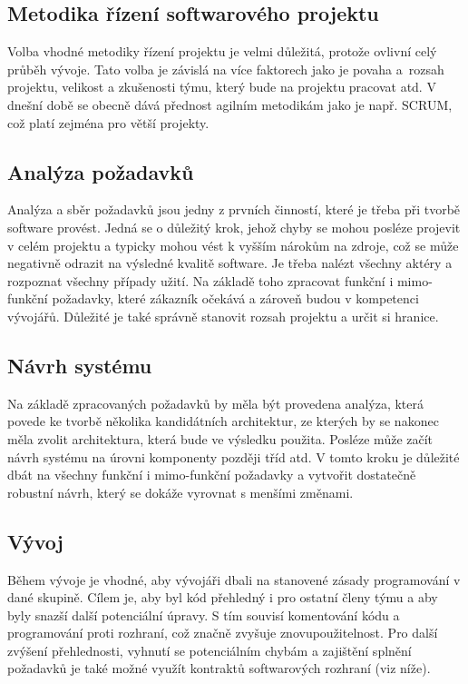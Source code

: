 	\subsection{Metodika řízení softwarového projektu}
		Volba vhodné metodiky řízení projektu je velmi důležitá, protože ovlivní celý průběh vývoje. Tato volba je závislá na více faktorech jako je povaha a~rozsah projektu, velikost a zkušenosti týmu, který bude na projektu pracovat atd. V dnešní době se obecně dává přednost agilním metodikám jako je např. SCRUM, což platí zejména pro větší projekty.
	
	\subsection{Analýza požadavků}
		Analýza a sběr požadavků jsou jedny z prvních činností, které je třeba při tvorbě software provést. Jedná se o důležitý krok, jehož chyby se mohou posléze projevit v celém projektu a typicky mohou vést k vyšším nárokům na zdroje, což se může negativně odrazit na výsledné kvalitě software. Je třeba nalézt všechny aktéry a rozpoznat všechny případy užití. Na základě toho zpracovat funkční i mimo-funkční požadavky, které zákazník očekává a zároveň budou v kompetenci vývojářů. Důležité je také správně stanovit rozsah projektu a určit si hranice. 

	\subsection{Návrh systému}
		Na základě zpracovaných požadavků by měla být provedena analýza, která povede ke tvorbě několika kandidátních architektur, ze kterých by se nakonec měla zvolit architektura, která bude ve výsledku použita. Posléze může začít návrh systému na úrovni komponenty později tříd atd. V tomto kroku je důležité dbát na všechny funkční i mimo-funkční požadavky a vytvořit dostatečně robustní návrh, který se dokáže vyrovnat s menšími změnami.
		
	\subsection{Vývoj}
		Během vývoje je vhodné, aby vývojáři dbali na stanovené zásady programování v dané skupině. Cílem je, aby byl kód přehledný i pro ostatní členy týmu a aby byly snazší další potenciální úpravy. S tím souvisí komentování kódu a programování proti rozhraní, což značně zvyšuje znovupoužitelnost. Pro další zvýšení přehlednosti, vyhnutí se potenciálním chybám a zajištění splnění požadavků je také možné využít kontraktů softwarových rozhraní (viz níže).
	
